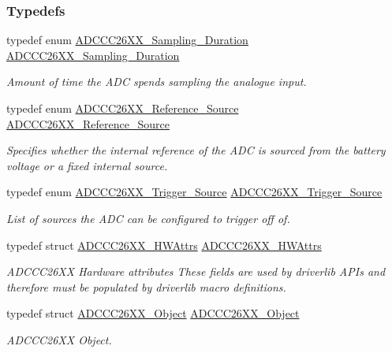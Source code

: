 \subsubsection*{Typedefs}
\begin{DoxyCompactItemize}
\item 
typedef enum \hyperlink{_a_d_c_c_c26_x_x_8h_adb3cf48cf9cac58a07ade90966bdb8f1}{A\+D\+C\+C\+C26\+X\+X\+\_\+\+Sampling\+\_\+\+Duration} \hyperlink{_a_d_c_c_c26_x_x_8h_a267282cd7cedc4f9562dd5ed3e112b7b}{A\+D\+C\+C\+C26\+X\+X\+\_\+\+Sampling\+\_\+\+Duration}
\begin{DoxyCompactList}\small\item\em Amount of time the A\+D\+C spends sampling the analogue input. \end{DoxyCompactList}\item 
typedef enum \hyperlink{_a_d_c_c_c26_x_x_8h_a5ed293d16be70036c4008865dbe33b98}{A\+D\+C\+C\+C26\+X\+X\+\_\+\+Reference\+\_\+\+Source} \hyperlink{_a_d_c_c_c26_x_x_8h_a3690de700d303a304c078243b30df922}{A\+D\+C\+C\+C26\+X\+X\+\_\+\+Reference\+\_\+\+Source}
\begin{DoxyCompactList}\small\item\em Specifies whether the internal reference of the A\+D\+C is sourced from the battery voltage or a fixed internal source. \end{DoxyCompactList}\item 
typedef enum \hyperlink{_a_d_c_c_c26_x_x_8h_ac122319c50b5f443f4d3254a2b2d58f0}{A\+D\+C\+C\+C26\+X\+X\+\_\+\+Trigger\+\_\+\+Source} \hyperlink{_a_d_c_c_c26_x_x_8h_a09a1c4f09a9c71437616da95458b10ea}{A\+D\+C\+C\+C26\+X\+X\+\_\+\+Trigger\+\_\+\+Source}
\begin{DoxyCompactList}\small\item\em List of sources the A\+D\+C can be configured to trigger off of. \end{DoxyCompactList}\item 
typedef struct \hyperlink{struct_a_d_c_c_c26_x_x___h_w_attrs}{A\+D\+C\+C\+C26\+X\+X\+\_\+\+H\+W\+Attrs} \hyperlink{_a_d_c_c_c26_x_x_8h_a02974734e3c626de2dfe586e4498addf}{A\+D\+C\+C\+C26\+X\+X\+\_\+\+H\+W\+Attrs}
\begin{DoxyCompactList}\small\item\em A\+D\+C\+C\+C26\+X\+X Hardware attributes These fields are used by driverlib A\+P\+Is and therefore must be populated by driverlib macro definitions. \end{DoxyCompactList}\item 
typedef struct \hyperlink{struct_a_d_c_c_c26_x_x___object}{A\+D\+C\+C\+C26\+X\+X\+\_\+\+Object} \hyperlink{_a_d_c_c_c26_x_x_8h_a2aca732c47705fd1004c9fa5d031620d}{A\+D\+C\+C\+C26\+X\+X\+\_\+\+Object}
\begin{DoxyCompactList}\small\item\em A\+D\+C\+C\+C26\+X\+X Object. \end{DoxyCompactList}\end{DoxyCompactItemize}
